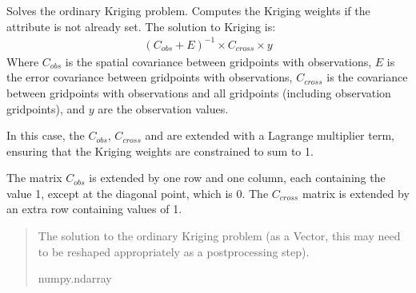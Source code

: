 \documentclass[letterpaper,10pt,english]{sphinxmanual}
\begin{document}
\begin{fulllineitems}
\begin{fulllineitems}
\begin{quote}
\begin{description}
\sphinxAtStartPar
{}

\end{description}\end{quote}

\end{fulllineitems}


\begin{fulllineitems}
\label{\detokenize{kriging:glomar_gridding.kriging.OrdinaryKriging.solve}}
\pysigstartsignatures
\pysiglinewithargsret
{}
{}
{}
\pysigstopsignatures
\sphinxAtStartPar
Solves the ordinary Kriging problem. Computes the Kriging weights if the
 attribute is not already set. The solution to Kriging
is:
\begin{equation*}
\begin{split}(C_{obs} + E)^{-1} \times C_{cross} \times y\end{split}
\end{equation*}
\sphinxAtStartPar
Where \(C_{obs}\) is the spatial covariance between grid\sphinxhyphen{}points
with observations, \(E\) is the error covariance between grid\sphinxhyphen{}points
with observations, \(C_{cross}\) is the covariance between
grid\sphinxhyphen{}points with observations and all grid\sphinxhyphen{}points (including observation
grid\sphinxhyphen{}points), and \(y\) are the observation values.

\sphinxAtStartPar
In this case, the \(C_{obs}\), \(C_{cross}\) and are extended
with a Lagrange multiplier term, ensuring that the Kriging weights are
constrained to sum to 1.

\sphinxAtStartPar
The matrix \(C_{obs}\) is extended by one row and one column, each
containing the value 1, except at the diagonal point, which is 0. The
\(C_{cross}\) matrix is extended by an extra row containing values
of 1.
\begin{quote}\begin{description}
\sphinxAtStartPar
The solution to the ordinary Kriging problem (as a Vector, this may
need to be re\sphinxhyphen{}shaped appropriately as a post\sphinxhyphen{}processing step).

\sphinxAtStartPar
numpy.ndarray


\end{description}
\end{quote}
\end{fulllineitems}
\end{fulllineitems}
\end{document}
